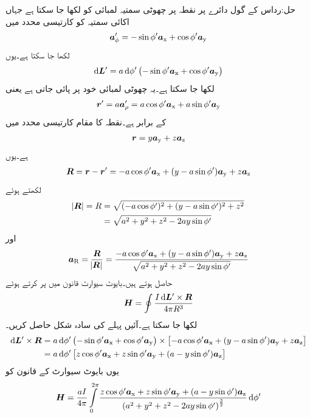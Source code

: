 حل:رداس  کے گول دائرے پر نقطہ  پر چھوٹی سمتیہ لمبائی کو  لکھا جا سکتا ہے جہاں اکائی سمتیہ  کو کارتیسی محدد میں
\begin{align*}
{\boldsymbol{a}}_{\phi}'=-\sin \phi' {\boldsymbol{a}}_{\textup{x}}+\cos \phi' {\boldsymbol{a}}_{\textup{y}} 
\end{align*}
لکھا جا سکتا ہے۔یوں
\begin{align*}
\dif \kvec{L}'= a \dif \phi' \left(-\sin \phi' \ax+\cos \phi' \ay  \right)
\end{align*}
لکھا جا سکتا ہے۔یہ چھوٹی لمبائی خود  پر پائی جاتی ہے یعنی
\begin{align*}
{\ensuremath{{\boldsymbol{r}}}}'=a {\boldsymbol{a}}_{\rho}'=a\cos \phi' {\boldsymbol{a}}_{\textup{x}}+a\sin \phi' {\boldsymbol{a}}_{\textup{y}}
\end{align*}
کے برابر ہے۔نقطہ  کا مقام کارتیسی محدد میں
\begin{align*}
{\ensuremath{{\boldsymbol{r}}}}=y{\boldsymbol{a}}_{\textup{y}}+z{\boldsymbol{a}}_{\textup{z}}
\end{align*}
ہے۔یوں
\begin{align*}
{\ensuremath{{\boldsymbol{R}}}}={{\boldsymbol{r}}}-{{\boldsymbol{r}}}'=-a\cos \phi' {\boldsymbol{a}}_{\textup{x}}+(y-a\sin \phi'){\boldsymbol{a}}_{\textup{y}}+z{\boldsymbol{a}}_{\textup{z}}
\end{align*}
لکھتے ہوئے
\begin{align*}
\abs{{{\boldsymbol{R}}}}=R&=\sqrt{(-a\cos \phi')^2+(y-a\sin \phi')^2+z^2}\\
&=\sqrt{a^2+y^2+z^2-2 a y\sin \phi'}
\end{align*}
اور
\begin{align*}
{\boldsymbol{a}}_{\textup{R}}=\frac{{{\boldsymbol{R}}}}{\abs{{{\boldsymbol{R}}}}}=\frac{-a\cos \phi' {\boldsymbol{a}}_{\textup{x}}+(y-a\sin \phi'){\boldsymbol{a}}_{\textup{y}}+z{\boldsymbol{a}}_{\textup{z}}}{\sqrt{a^2+y^2+z^2-2 a y\sin \phi'}}
\end{align*}
حاصل ہوتے ہیں۔بایوٹ سیوارٹ قانون میں   پر کرتے ہوئے 
\begin{align*}
\kvec{H}=\oint \frac{I \dif \kvec{L}' \times \kvec{R}}{4\pi R^3}
\end{align*}
لکھا جا سکتا ہے۔آئیں پہلے  کی سادہ شکل حاصل کریں۔
\begin{align*}
\dif \kvec{L}' \times \kvec{R}&=a \dif \phi' \left(-\sin \phi' \ax+\cos \phi' \ay  \right) \times \left[-a\cos \phi' \ax+(y-a\sin \phi')\ay+z\az \right]\\
&=a \dif \phi' \left[z\cos \phi' \ax+z\sin \phi' \ay+(a-y\sin\phi')\az \right]
\end{align*}
یوں بایوٹ سیوارٹ کے قانون کو
\begin{align*}
\kvec{H}=\frac{a I}{4\pi}\int \limits_{0}^{2\pi} \frac{z\cos \phi' \ax+z\sin \phi' \ay+(a-y\sin\phi')\az}{\left(a^2+y^2+z^2-2 a y\sin \phi'\right)^{\frac{3}{2}}} \dif \phi'
\end{align*}
